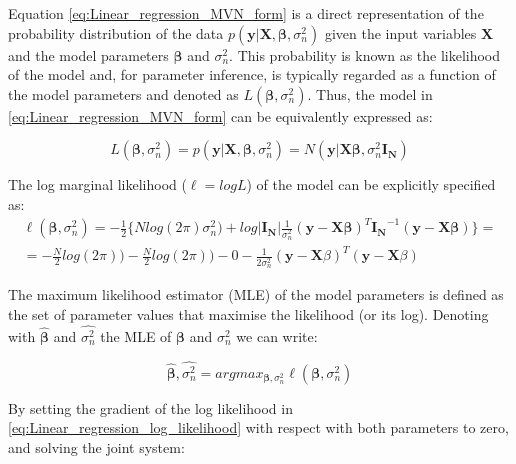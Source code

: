 Equation \eqref{eq:Linear_regression_MVN_form} is a direct representation of the probability distribution of the data $p(\mathbf{y}| \mathbf{X}, \boldsymbol{\beta}, \sigma_n^2)$ given the input variables $\mathbf{X}$ and the model parameters $\boldsymbol{\beta}$ and $\sigma_n^2$.
This probability is known as the likelihood of the model and, for parameter inference, is typically regarded as a function of the model parameters and denoted as $L(\boldsymbol{\beta}, \sigma_n^2)$. 
Thus, the model in \eqref{eq:Linear_regression_MVN_form} can be equivalently expressed as:

\begin{equation} \label{eq:Linear_regression_likelihood}
 L(\boldsymbol{\beta}, \sigma_n^2) = p(\mathbf{y}| \mathbf{X}, \boldsymbol{\beta}, \sigma_n^2) = N(\mathbf{y} | \mathbf{X}\boldsymbol{\beta}, \sigma_n^2 \mathbf{I_N}) 
\end{equation}

The log marginal likelihood ($\ell = logL$) of the model can be explicitly specified as:\\

\begin{equation} \label{eq:Linear_regression_log_likelihood}
\begin{split}
 \ell(\boldsymbol{\beta}, \sigma_n^2) = -\frac{1}{2} \bigg\{Nlog(2\pi)\sigma_n^2) + log|\mathbf{I_N}| \frac{1}{\sigma_n^2}(\mathbf{y}-\mathbf{X}\boldsymbol{\beta})^T\mathbf{I_N}^{-1}(\mathbf{y}-\mathbf{X}\boldsymbol{\beta}) \bigg\}  = \\
= -\frac{N}{2}log(2\pi)) - \frac{N}{2}log(2\pi))- 0 - \frac{1}{2\sigma_n^2}(\mathbf{y}-\mathbf{X}\beta)^T(\mathbf{y}-\mathbf{X}\beta)  
\end{split}
\end{equation}

The maximum likelihood estimator (MLE) of the model parameters is defined as the set of parameter values that maximise the likelihood (or its log). 
Denoting with $\hat{\boldsymbol{\beta}}$ and $\hat{\sigma_n^2}$ the MLE of $\boldsymbol{\beta}$ and $\sigma_n^2$ we can write:

\begin{equation} \label{eq:Linear_regression_MLEs}
\hat{\boldsymbol{\beta}},\hat{\sigma_n^2} = argmax_{\boldsymbol{\beta},\sigma_n^2}\ell(\boldsymbol{\beta}, \sigma_n^2) 
\end{equation} 

By setting the gradient of the log likelihood in \eqref{eq:Linear_regression_log_likelihood} with respect with both parameters to zero, and solving the joint system:

